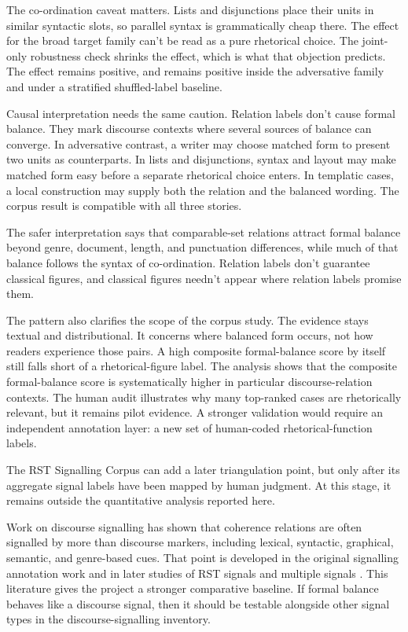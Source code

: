 \documentclass[12pt]{article}
\begin{document}
The co-ordination caveat matters. Lists and disjunctions place their units
in similar syntactic slots, so parallel syntax is grammatically cheap
there. The effect for the broad target family can't be read as a pure
rhetorical choice. The joint-only robustness check shrinks the effect,
which is what that objection predicts. The effect remains positive, and
 remains positive inside the adversative
family and under a stratified shuffled-label baseline.

Causal interpretation needs the same caution. Relation labels don't cause
formal balance. They mark discourse contexts where several sources of
balance can converge. In adversative contrast, a writer may choose matched
form to present two units as counterparts. In lists and disjunctions,
syntax and layout may make matched form easy before a separate rhetorical
choice enters. In templatic cases, a local construction may supply both
the relation and the balanced wording. The corpus result is compatible
with all three stories.

The safer interpretation says that comparable-set relations attract
formal balance beyond genre, document, length, and punctuation
differences, while much of that balance follows the syntax of
co-ordination. Relation labels don't guarantee classical figures, and
classical figures needn't appear where relation labels promise them.

The pattern also clarifies the scope of the corpus study. The evidence
stays textual and distributional. It concerns where balanced form occurs,
not how readers experience those pairs. A high composite formal-balance
score by itself still falls short of a rhetorical-figure label. The
analysis shows that the composite formal-balance score is systematically
higher in particular discourse-relation contexts. The human audit
illustrates why many top-ranked cases are rhetorically relevant, but it
remains pilot evidence. A stronger validation would require an independent
annotation layer: a new set of human-coded rhetorical-function labels.

The RST Signalling Corpus can add a later triangulation point, but only after
its aggregate signal labels have been mapped by human judgment. At this stage,
it remains outside the quantitative analysis reported here.

Work on discourse signalling has shown that coherence
relations are often signalled by more than discourse markers, including
lexical, syntactic, graphical, semantic, and genre-based cues. That point
is developed in the original signalling annotation work and in later
studies of RST signals and multiple signals
\citep{taboadaDas2013AnnotationUponAnnotation,dasTaboada2018RSTSignallingCorpus,dasTaboada2018SignallingBeyondMarkers,dasTaboada2019MultipleSignals}.
This literature gives the project a stronger comparative baseline. If
formal balance behaves like a discourse signal, then it should be
testable alongside other signal types in the discourse-signalling inventory.
\end{document}
